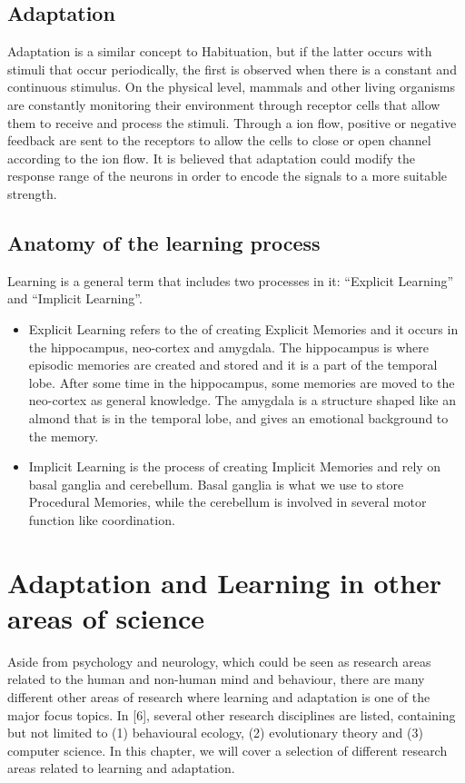 \documentclass[conference]{IEEEtran}
\begin{document}
	\subsection{Adaptation}\label{Ad}
		Adaptation is a similar concept to Habituation, but if the latter occurs with stimuli that occur periodically, the first is observed when there is a constant and continuous stimulus.
		On the physical level, mammals and other living organisms are constantly monitoring their environment through receptor cells that allow them to receive and process the stimuli. Through a ion flow, positive or negative feedback are sent to the receptors to allow the cells to close or open channel according to the ion flow. \cite{b8}
		It is believed that adaptation could modify the response range of the neurons in order to encode the signals to a more suitable strength. \cite{b9}

	\subsection{Anatomy of the learning process}\label{ALP}
		Learning is a general term that includes two processes in it: ``Explicit Learning'' and ``Implicit Learning''.
		\begin{itemize}
			\item Explicit Learning refers to the of creating Explicit Memories and it occurs in the hippocampus, neo-cortex and amygdala. \cite{b10} The hippocampus is where episodic memories are created and stored and it is a part of the temporal lobe. After some time in the hippocampus, some memories are moved to the neo-cortex as general knowledge. The amygdala is a structure shaped like an almond that is in the temporal lobe, and gives an emotional background to the memory.
			\item Implicit Learning is the process of creating Implicit Memories and rely on basal ganglia and cerebellum. \cite{b11} Basal ganglia is what we use to store Procedural Memories, while the cerebellum is involved in several motor function like coordination.
		\end{itemize}

\section{Adaptation and Learning in other areas of science}
	Aside from psychology and neurology, which could be seen as research areas related to the human and non-human mind and behaviour, there are many different other areas of research where learning and adaptation is one of the major focus topics. In [6], several other research disciplines are listed, containing but not limited to (1) behavioural ecology, (2) evolutionary theory and (3) computer science. In this chapter, we will cover a selection of different research areas related to learning and adaptation.
\end{document}
